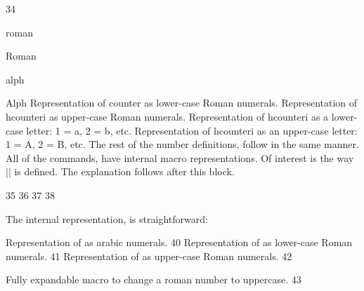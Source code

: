 \begin{teXXX}
34 \def\arabic#1{\expandafter\@arabic\csname c@#1\endcsname}
\end{teXXX}

\begin{docCommand}{roman} {}
\end{docCommand}
\begin{docCommand}{Roman}{}
\begin{docCommand}{alph}{}
\begin{docCommand}{Alph}{}
Representation of counter as lower-case Roman numerals.  Representation of hcounteri as upper-case Roman numerals.  Representation of hcounteri as a lower-case letter: 1 = a, 2 = b, etc.  Representation of hcounteri as an upper-case letter: 1 = A, 2 = B, etc.
The rest of the number definitions, follow in the same manner.  All of the commands, have internal macro representations. Of interest is the way |\Roman| is defined. The explanation follows after this block.

\end{docCommand}
\end{docCommand}
\end{docCommand}

\begin{teXXX}
35 \def\roman#1{\expandafter\@roman\csname c@#1\endcsname}
36 \def\Roman#1{\expandafter\@Roman\csname c@#1\endcsname}
37 \def\alph#1{\expandafter\@alph\csname c@#1\endcsname}
38 \def\Alph#1{\expandafter\@Alph\csname c@#1\endcsname}
\end{teXXX}

The internal representation, is straightforward:

\begin{teXXX}
\@arabic \@arabic\FOOcounter Representation of \FOOcounter as arabic numerals.
40 \def\@arabic#1{\number #1} %
\@roman \@roman\FOOcounter Representation of \FOOcounter as lower-case Roman numerals.
41 \def\@roman#1{\romannumeral #1}
\@Roman \@Roman\FOOcounter Representation of \FOOcounter as upper-case Roman numerals.
42 \def\@Roman#1{\expandafter\@slowromancap\romannumeral #1@}
\end{teXXX}



\begin{teXXX}
\@slowromancap Fully expandable macro to change a roman number to uppercase.
43 \def\@slowromancap#1{\ifx @#1%
44 \else
45 \if i#1I\else\if v#1V\else\if x#1X\else\if l#1L\else\if
46 c#1C\else\if d#1D\else \if m#1M\else#1\fi\fi\fi\fi\fi\fi\fi
47 \expandafter\@slowromancap
48 \fi
49 }
\end{teXXX}



